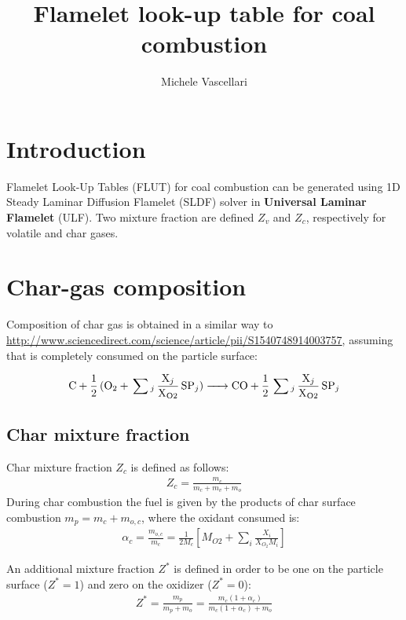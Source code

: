 \documentclass[]{scrartcl}
\title{Flamelet look-up table for coal combustion}
\author{Michele Vascellari}
\begin{document}
\maketitle

\begin{abstract}

\end{abstract}

\section{Introduction}
Flamelet Look-Up Tables (FLUT) for coal combustion can be generated using 1D Steady Laminar Diffusion Flamelet (SLDF) solver in \textbf{Universal Laminar Flamelet} (ULF).
Two mixture fraction are defined $Z_v$ and $Z_c$, respectively for volatile and char gases.

\section{Char-gas composition}
\label{sec:char-gas-composition}

Composition of char gas is obtained in a similar way to \url{http://www.sciencedirect.com/science/article/pii/S1540748914003757}, assuming that  is completely consumed on the particle surface:

\begin{equation}
\ce{C + 1/2 (O2 + \sum_j \frac{X_j}{X_{O2}} SP_j) -> CO + 1/2 \sum_j \frac{X_j}{X_{O2}} SP_j}
\end{equation}

\subsection{Char mixture fraction}
Char mixture fraction $Z_c$ is defined as follows:
\begin{eqnarray}
Z_c = \frac{m_c}{m_c+m_v+m_o}
\end{eqnarray}
During char combustion the fuel is given by the products of char surface combustion $m_p = m_c + m_{o,c}$, where the oxidant consumed is:
\begin{eqnarray}
\alpha_c = \frac{m_{o,c}}{m_c} = \frac{1}{2 M_c} \left[ M_{O2} + \sum_i \frac{X_i}{X_{O_2}M_i} \right]
\end{eqnarray}

An additional mixture fraction $Z^*$ is defined in order to be one on the particle surface ($Z^*=1$) and zero on the oxidizer ($Z^*=0$):
\begin{eqnarray}
Z^* = \frac{m_p}{m_p+m_o} = \frac{m_c (1+\alpha_c)}{m_c (1+\alpha_c) + m_o}
\end{eqnarray}
\end{document}
